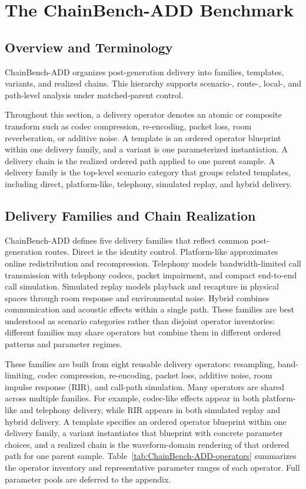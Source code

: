 \section{The ChainBench-ADD Benchmark}
\label{sec:benchmark}

\subsection{Overview and Terminology}
ChainBench-ADD organizes post-generation delivery into families, templates, variants, and realized chains. This hierarchy supports scenario-, route-, local-, and path-level analysis under matched-parent control.

Throughout this section, a delivery operator denotes an atomic or composite transform such as codec compression, re-encoding, packet loss, room reverberation, or additive noise. A template is an ordered operator blueprint within one delivery family, and a variant is one parameterized instantiation. A delivery chain is the realized ordered path applied to one parent sample. A delivery family is the top-level scenario category that groups related templates, including direct, platform-like, telephony, simulated replay, and hybrid delivery.

\subsection{Delivery Families and Chain Realization}
ChainBench-ADD defines five delivery families that reflect common post-generation routes. Direct is the identity control. Platform-like approximates online redistribution and recompression. Telephony models bandwidth-limited call transmission with telephony codecs, packet impairment, and compact end-to-end call simulation. Simulated replay models playback and recapture in physical spaces through room response and environmental noise. Hybrid combines communication and acoustic effects within a single path. These families are best understood as scenario categories rather than disjoint operator inventories: different families may share operators but combine them in different ordered patterns and parameter regimes.

These families are built from eight reusable delivery operators: resampling, band-limiting, codec compression, re-encoding, packet loss, additive noise, room impulse response (RIR), and call-path simulation. Many operators are shared across multiple families. For example, codec-like effects appear in both platform-like and telephony delivery, while RIR appears in both simulated replay and hybrid delivery. A template specifies an ordered operator blueprint within one delivery family, a variant instantiates that blueprint with concrete parameter choices, and a realized chain is the waveform-domain rendering of that ordered path for one parent sample. Table~\ref{tab:ChainBench-ADD-operators} summarizes the operator inventory and representative parameter ranges of each operator. Full parameter pools are deferred to the appendix.

